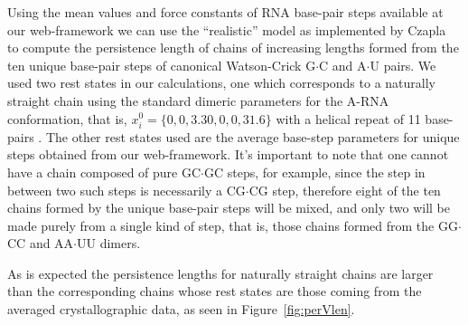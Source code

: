 Using  the mean  values and  force  constants of  RNA base-pair  steps
available at our  web-framework we can use the  ``realistic'' model as
implemented  by  Czapla~\cite{czapla2006}  to compute  the  persistence
length  of chains  of increasing  lengths formed  from the  ten unique
base-pair  steps  of canonical  Watson-Crick  G$\cdot$C and  A$\cdot$U
pairs.   We  used two  rest  states  in  our calculations,  one  which
corresponds to  a naturally straight chain using  the standard dimeric
parameters for  the A-RNA conformation,  that is, $x_{i}^{0} =  \{0, 0,
  3.30,  0,  0,  31.6\}$ with   a  helical  repeat  of  11  base-pairs
\cite{arnott1999}.   The  other  rest  states  used  are  the  average
base-step   parameters   for    unique   steps   obtained   from   our
web-framework. It's  important to  note that one  cannot have  a chain
composed of  pure GC$\cdot$GC  steps, for example,  since the  step in
between two  such steps is  necessarily a CG$\cdot$CG  step, therefore
eight of the  ten chains formed by the unique  base-pair steps will be
mixed, and  only two will be made  purely from a single  kind of step,
that  is, those  chains formed  from the  GG$\cdot$CC  and AA$\cdot$UU
dimers.

As is expected the persistence lengths for naturally straight chains
are larger than the corresponding chains whose rest states are those
coming from the averaged crystallographic data, as seen in
Figure~\ref{fig:perVlen}.

